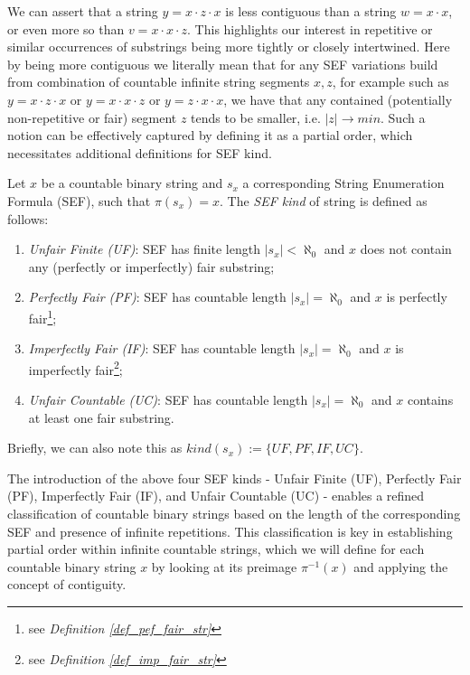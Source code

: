 We can assert that a string $y = x \cdot z \cdot x$ is less contiguous than a string $w = x \cdot x$, or even more so than $v = x \cdot x \cdot z$. This highlights our interest in repetitive or similar occurrences of substrings being more tightly or closely intertwined. Here by being more contiguous we literally mean that for any SEF variations build from combination of countable infinite string segments $x,z$, for example such as $y = x \cdot z \cdot x$ or $y = x \cdot x \cdot z$ or $y = z \cdot x \cdot x$, we have that any contained (potentially non-repetitive or fair) segment $z$ tends to be smaller, i.e. $|z| \to min$. Such a notion can be effectively captured by defining it as a partial order, which necessitates additional definitions for SEF kind.

\begin{definition}\label{def_part_sef_kind}
  Let $x$ be a countable binary string and $s_x$ a corresponding String Enumeration Formula (SEF), such that $\pi(s_x) = x$. The \textit{SEF kind} of string is defined as follows:
  \begin{enumerate}
    \item \textit{Unfair Finite (UF)}: SEF has finite length $|s_x| < \aleph_0$ and $x$ does not contain any (perfectly or imperfectly) fair substring;
    \item \textit{Perfectly Fair (PF)}: SEF has countable length $|s_x| = \aleph_0$ and $x$ is perfectly fair\footnote{see \textit{Definition \ref{def_pef_fair_str}}};
    \item \textit{Imperfectly Fair (IF)}: SEF has countable length $|s_x| = \aleph_0$ and $x$ is imperfectly fair\footnote{see \textit{Definition \ref{def_imp_fair_str}}};
    \item \textit{Unfair Countable (UC)}: SEF has countable length $|s_x| = \aleph_0$ and $x$ contains at least one fair substring.
  \end{enumerate}
  Briefly, we can also note this as $kind(s_x) := \{UF, PF, IF, UC\}$.
\end{definition}
  
The introduction of the above four SEF kinds - Unfair Finite (UF), Perfectly Fair (PF), Imperfectly Fair (IF), and Unfair Countable (UC) - enables a refined classification of countable binary strings based on the length of the corresponding SEF and presence of infinite repetitions. This classification is key in establishing partial order within infinite countable strings, which we will define for each countable binary string $x$ by looking at its preimage $\pi^{-1}(x)$ and applying the concept of contiguity.

